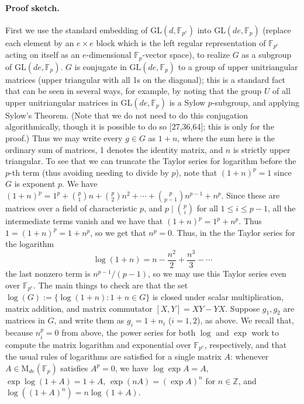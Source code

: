 \documentclass[10pt,a4paper]{article}
\begin{document}
\paragraph{Proof sketch.}
First we use the standard embedding of $\mathrm{GL}(d,\mathbb F_{p^e})$ into $\mathrm{GL}(de,\mathbb F_p)$ (replace each element by an $e\times e$ block which is the left regular representation of $\mathbb F_{p^e}$ acting on itself as an $e$-dimensional $\mathbb F_p$-vector space), to realize $G$ as a subgroup of $\mathrm{GL}(de,\mathbb F_p)$. $G$ is conjugate in $\mathrm{GL}(de,\mathbb F_p)$ to a group of upper unitriangular matrices (upper triangular with all 1s on the diagonal); this is a standard fact that can be seen in several ways, for example, by noting that the group $U$ of all upper unitriangular matrices in $\mathrm{GL}(de,\mathbb F_p)$ is a Sylow $p$-subgroup, and applying Sylow's Theorem. (Note that we do not need to do this conjugation algorithmically, though it is possible to do so [27,36,64]; this is only for the proof.) Thus we may write every $g\in G$ as $1+n$, where the sum here is the ordinary sum of matrices, 1 denotes the identity matrix, and $n$ is strictly upper triangular. To see that we can truncate the Taylor series for logarithm before the $p$-th term (thus avoiding needing to divide by $p$), note that $(1+n)^p=1$ since $G$ is exponent $p$. We have $(1+n)^p=1^p+\binom p1n+\binom p2n^2+\cdots+\binom p{p-1}n^{p-1}+n^p$. Since these are matrices over a field of characteristic $p$, and $p\mid\binom pi$ for all $1\le i\le p-1$, all the intermediate terms vanish and we have that $(1+n)^p=1^p+n^p$. Thus $1=(1+n)^p=1+n^p$, so we get that $n^p=0$. Thus, in the the Taylor series for the logarithm
\[\log(1+n)=n-\frac{n^2}2+\frac{n^3}3-\cdots\]
the last nonzero term is $n^{p-1}/(p-1)$, so we may use this Taylor series even over $\mathbb F_{p^e}$.
The main things to check are that the set $\log(G):=\{\log(1+n):1+n\in G\}$ is closed under scalar multiplication, matrix addition, and matrix commutator $[X,Y]=XY-YX$. Suppose $g_1,g_2$ are matrices in $G$, and write them as $g_i=1+n_i$ ($i=1,2$), as above. We recall that, because $n_i^p=0$ from above, the power series for both $\log$ and $\exp$ work to compute the matrix logarithm and exponential over $\mathbb F_{p^e}$, respectively, and that the usual rules of logarithms are satisfied for a single matrix $A$: whenever $A\in\mathrm M_{de}(\mathbb F_p)$ satisfies $A^p=0$, we have $\log\exp A=A$, $\exp\log(1+A)=1+A$, $\exp(nA)=(\exp A)^n$ for $n\in\mathbb Z$, and $\log((1+A)^n)=n\log(1+A)$.
\end{document}
